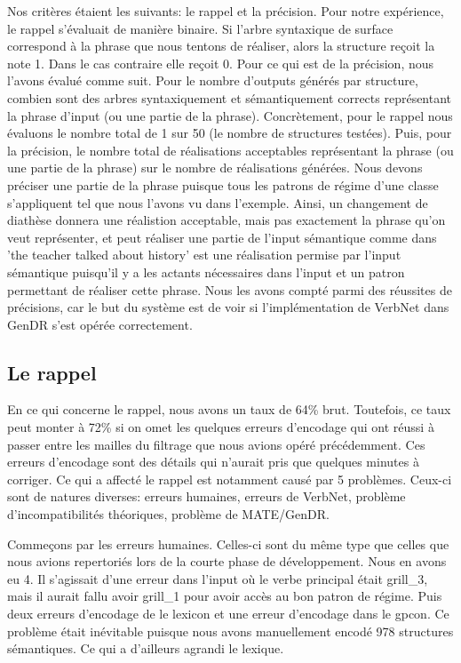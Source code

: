 Nos critères étaient les suivants: le rappel et la précision. Pour notre expérience, le rappel s'évaluait de manière binaire. Si l'arbre syntaxique de surface correspond à la phrase que nous tentons de réaliser, alors la structure reçoit la note 1. Dans le cas contraire elle reçoit 0. Pour ce qui est de la précision, nous l'avons évalué comme suit. Pour le nombre d'outputs générés par structure, combien sont des arbres syntaxiquement et sémantiquement corrects représentant la phrase d'input (ou une partie de la phrase). Concrètement, pour le rappel nous évaluons le nombre total de 1 sur 50 (le nombre de structures testées). Puis, pour la précision, le nombre total de réalisations acceptables représentant la phrase (ou une partie de la phrase) sur le nombre de réalisations générées. Nous devons préciser une partie de la phrase puisque tous les patrons de régime d'une classe s'appliquent tel que nous l'avons vu dans l'exemple. Ainsi, un changement de diathèse donnera une réalistion acceptable, mais pas exactement la phrase qu'on veut représenter, et peut réaliser une partie de l'input sémantique comme dans 'the teacher talked about history' est une réalisation permise par l'input sémantique puisqu'il y a les actants nécessaires dans l'input et un patron permettant de réaliser cette phrase. Nous les avons compté parmi des réussites de précisions, car le but du système est de voir si l'implémentation de VerbNet dans GenDR s'est opérée correctement.

\subsection{Le rappel}

En ce qui concerne le rappel, nous avons un taux de 64\% brut. Toutefois, ce taux peut monter à 72\% si on omet les quelques erreurs d'encodage qui ont réussi à passer entre les mailles du filtrage que nous avions opéré précédemment. Ces erreurs d'encodage sont des détails qui n'aurait pris que quelques minutes à corriger. Ce qui a affecté le rappel est notamment causé par 5 problèmes. Ceux-ci sont de natures diverses: erreurs humaines, erreurs de VerbNet, problème d'incompatibilités théoriques, problème de MATE/GenDR.

Commeçons par les erreurs humaines. Celles-ci sont du même type que celles que nous avions repertoriés lors de la courte phase de développement. Nous en avons eu 4. Il s'agissait d'une erreur dans l'input où le verbe principal était grill\_3, mais il aurait fallu avoir grill\_1 pour avoir accès au bon patron de régime. Puis deux erreurs d'encodage de le lexicon et une erreur d'encodage dans le gpcon. Ce problème était inévitable puisque nous avons manuellement encodé 978 structures sémantiques. Ce qui a d'ailleurs agrandi le lexique.

